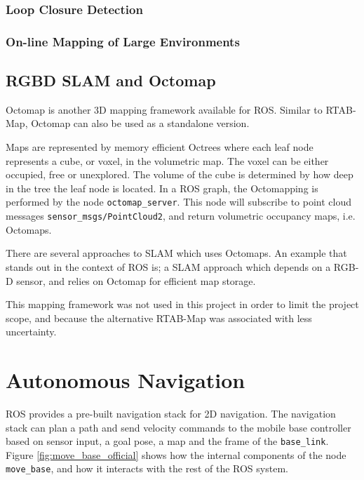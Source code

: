 \subsubsection{Loop Closure Detection}

\subsubsection{On-line Mapping of Large Environments}



\subsection{RGBD SLAM and Octomap}

Octomap\cite{hornung13auro} is another 3D mapping framework available for \ac{ROS}. Similar to \ac{RTAB-Map}, Octomap can also be used as a standalone version. 

Maps are represented by memory efficient Octrees where each leaf node represents a cube, or voxel, in the volumetric map. The voxel can be either occupied, free or unexplored. The volume of the cube is determined by how deep in the tree the leaf node is located. In a \ac{ROS} graph, the Octomapping is performed by the node \texttt{octomap\_server}. This node  will subscribe to point cloud messages \texttt{sensor\_msgs/PointCloud2}, and return volumetric occupancy maps, i.e. Octomaps.

There are several approaches to \ac{SLAM}  which uses Octomaps. An example that stands out in the context of \ac{ROS} is\cite{endres20143}; a \ac{SLAM} approach which depends on a RGB-D sensor, and relies on Octomap for efficient map storage.

This mapping framework was not used in this project in order to limit the project scope, and because the alternative \ac{RTAB-Map} was associated with less uncertainty.

\section{Autonomous Navigation}

\ac{ROS} provides a pre-built navigation stack for 2D navigation. The navigation stack can plan a path and send velocity commands to the mobile base controller based on sensor input, a goal pose, a map and the frame of the \texttt{base\_link}. Figure \ref{fig:move_base_official} shows how the internal components of the node \texttt{move\_base}, and how it interacts with the rest of the \ac{ROS} system. 

